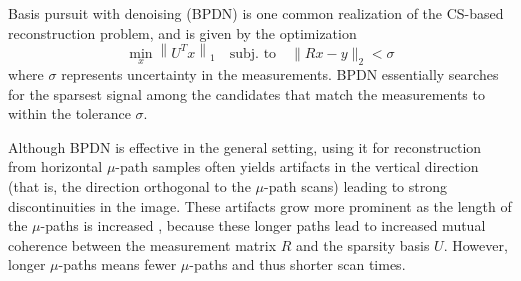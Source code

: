 \documentclass[journal]{IEEEtran}
\begin{document}
Basis pursuit with denoising (BPDN) is one common realization of the
CS-based reconstruction problem, and is given by the optimization
\begin{equation}
  \min_{x} \left \| U^Tx \right \|_1 \quad
  \text{subj. to}\quad %
  \|Rx-y\|_2 < \sigma \label{op:bp}
\end{equation}
where $\sigma$ represents uncertainty in the measurements. BPDN
essentially searches for the sparsest signal among the candidates
that match the measurements to within the tolerance $\sigma$.

Although BPDN is effective in the general setting, using it for
reconstruction from horizontal $\mu$-path samples often yields
artifacts in the vertical direction (that is, the direction orthogonal
to the $\mu$-path scans) leading to strong discontinuities in the
image. These artifacts grow more prominent as the length of the
$\mu$-paths is increased \cite{maxwell2014compressed}, because these
longer paths lead to increased mutual coherence between the
measurement matrix $R$ and the sparsity basis $U$. However, longer
$\mu$-paths means fewer $\mu$-paths and thus shorter scan times.
\end{document}
